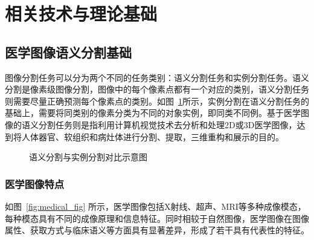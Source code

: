 \section{相关技术与理论基础}

\subsection{医学图像语义分割基础}

图像分割任务可以分为两个不同的任务类别：语义分割任务和实例分割任务\cite{azad2024}。语义分割是像素级图像分割，图像中的每个像素点都有一个对应的类别，语义分割任务则需要尽量正确预测每个像素点的类别。如图~\ref{fig:seg}所示，实例分割在语义分割任务的基础上，需要将同类别的像素分类为不同的对象实例，即同类不同例。基于医学图像的语义分割任务则是指利用计算机视觉技术去分析和处理2D或3D医学图像，达到将人体器官、软组织和病灶体进行分割、提取，三维重构和展示的目的\cite{liu2021}。

\begin{figure}[htbp]
    \centering
    \caption{语义分割与实例分割对比示意图\cite{kirillov2019}}
    \label{fig:seg}
\end{figure}

\subsubsection{医学图像特点}

如图~\ref{fig:medical_fig} 所示，医学图像包括X射线、超声、MRI等多种成像模态，每种模态具有不同的成像原理和信息特征。同时相较于自然图像，医学图像在图像属性、获取方式与临床语义等方面具有显著差异，形成了若干具有代表性的特征。

